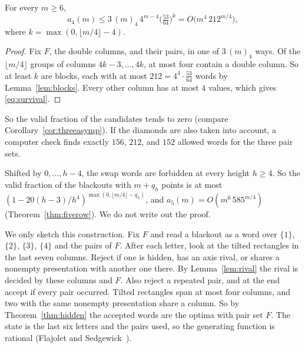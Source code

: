 \begin{theorem}\label{thm:foursurvival}
For every $m\ge6$,
\begin{equation}\label{eq:survival}
a_4(m)\le3\,(m)_4\,4^{m-4}\bigl(\tfrac{53}{64}\bigr)^k=O\bigl(m^4\,212^{m/4}\bigr),
\end{equation}
where $k=\max(0,\lfloor m/4\rfloor-4)$.
\end{theorem}

\begin{proof}
Fix $F$, the double columns, and their pairs, in one of $3\,(m)_4$ ways. Of the $\lfloor m/4\rfloor$ groups of columns $4k-3,\ldots,4k$, at most four contain a double column. So at least $k$ are blocks, each with at most $212=4^4\cdot\frac{53}{64}$ words by Lemma~\ref{lem:blocks}. Every other column has at most $4$ values, which gives \eqref{eq:survival}.
\end{proof}

So the valid fraction of the candidates tends to zero (compare Corollary~\ref{cor:threeasymp}). If the diamonds are also taken into account, a computer check finds exactly $156$, $212$, and $152$ allowed words for the three pair sets.

\begin{remark}\label{rem:rarity}
Shifted by $0,\ldots,h-4$, the swap words are forbidden at every height $h\ge4$. So the valid fraction of the blackouts with $m+q_h$ points is at most $(1-20(h-3)/h^4)^{\max(0,\lfloor m/4\rfloor-q_h)}$, and $a_5(m)=O(m^6\,585^{m/4})$ (Theorem~\ref{thm:fiverow}). We do not write out the proof.

\end{remark}

\begin{remark}\label{rem:fourmemory}
We only sketch this construction. Fix $F$ and
 read a blackout as a word over $\{1\}$, $\{2\}$, $\{3\}$, $\{4\}$ and the pairs of $F$. After each letter, look at the tilted rectangles in the last seven columns. Reject if one is hidden, has an axis rival, or shares a nonempty presentation with another one there. By Lemma~\ref{lem:rival} the rival is decided by these columns and $F$. Also reject a repeated pair, and at the end accept if every pair occurred. Tilted rectangles span at most four columns, and two with the same nonempty presentation share a column. So by Theorem~\ref{thm:hidden} the accepted words are the optima with pair set $F$. The state is the last six letters and the pairs used, so the generating function is rational (Flajolet and Sedgewick~\cite[Section~V.5]{flajolet2009}).
\end{remark}

